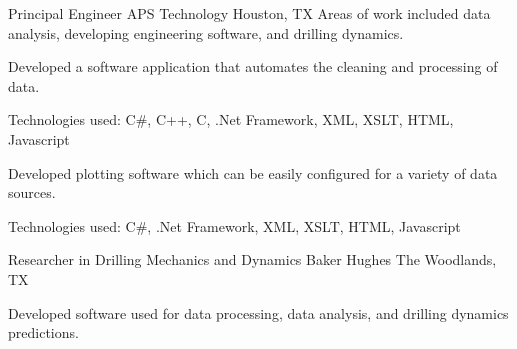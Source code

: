 \documentclass{leresume}
\begin{document}
            {Principal Engineer}
            {APS Technology}
			{Houston, TX}
			Areas of work included data analysis, developing engineering software, and drilling dynamics.\nolinebreak[4]
		\begin{bulletedlist}
			
		\item
		
				Developed a software application that automates the cleaning and processing of data.
			
		\begin{bulletedlist}
			
		\item
		
					Technologies used: C\#, C++, C, .Net Framework, XML, XSLT, HTML, Javascript
				
		\end{bulletedlist}
	
		\item
		
				Developed plotting software which can be easily configured for a variety of data sources.
			
		\begin{bulletedlist}
			
		\item
		
					Technologies used: C\#, .Net Framework, XML, XSLT, HTML, Javascript
				
		\end{bulletedlist}
	
		\end{bulletedlist}
	
            {Researcher in Drilling Mechanics and Dynamics}
            {Baker Hughes}
			{The Woodlands, TX}
			
			Developed software used for data processing, data analysis, and drilling dynamics predictions.
		
\end{document}
